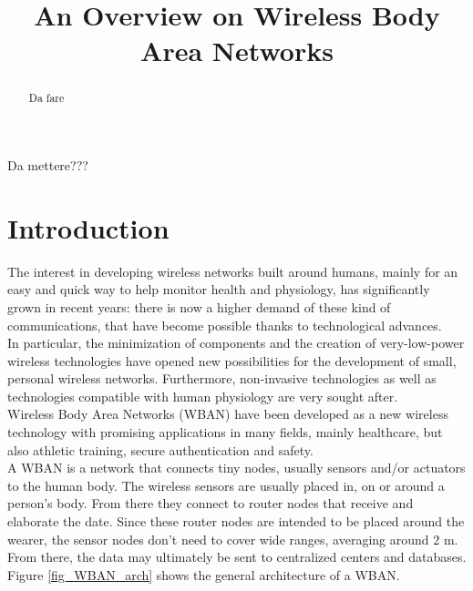 \documentclass[conference]{IEEEtran}
\begin{document}
\title{An Overview on Wireless Body Area Networks}

\author{
	
}

\maketitle

\begin{abstract}
Da fare
\end{abstract}

\begin{IEEEkeywords}
Da mettere??? %
\end{IEEEkeywords}

\section{Introduction}
The interest in developing wireless networks built around humans, mainly for an easy and quick way to help monitor health and physiology, has significantly grown in recent years: there is now a higher demand of these kind of communications, that have become possible thanks to technological advances.
\\In particular, the minimization of components and the creation of very-low-power wireless technologies have opened new possibilities for the development of small, personal wireless networks. Furthermore, non-invasive technologies as well as technologies compatible with human physiology are very sought after.
\\Wireless Body Area Networks (WBAN) have been developed as a new wireless technology with promising applications in many fields, mainly healthcare, but also athletic training, secure authentication and safety.
\\A WBAN is a network that connects tiny nodes, usually sensors and/or actuators to the human body. The wireless sensors are usually placed in, on or around a person’s body. From there they connect to router nodes that receive and elaborate the date. Since these router nodes are intended to be placed around the wearer, the sensor nodes don’t need to cover wide ranges, averaging around 2 m. From there, the data may ultimately be sent to centralized centers and databases. Figure \ref{fig_WBAN_arch} shows the general architecture of a WBAN.
\end{document}
